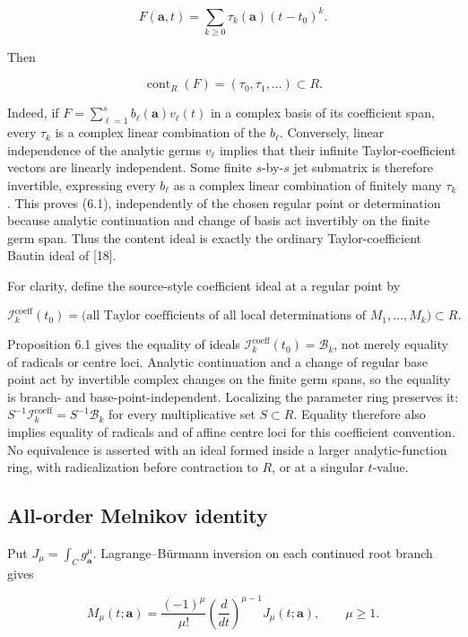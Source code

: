 \documentclass[
  11pt,
  a4paper,
]{amsart}
\begin{document}
\[
F(\boldsymbol a,t)=\sum_{k\ge0}\tau_k(\boldsymbol a)(t-t_0)^k.
\]

Then

\[
\operatorname{cont}_R(F)=(\tau_0,\tau_1,\ldots)\subset R.       \tag{6.1}
\]

Indeed, if \(F=\sum_{\ell=1}^sb_\ell(\boldsymbol a)v_\ell(t)\) in a
complex basis of its coefficient span, every \(\tau_k\) is a complex
linear combination of the \(b_\ell\). Conversely, linear independence of
the analytic germs \(v_\ell\) implies that their infinite
Taylor-coefficient vectors are linearly independent. Some finite
\(s\)-by-\(s\) jet submatrix is therefore invertible, expressing every
\(b_\ell\) as a complex linear combination of finitely many \(\tau_k\).
This proves (6.1), independently of the chosen regular point or
determination because analytic continuation and change of basis act
invertibly on the finite germ span. Thus the content ideal is exactly
the ordinary Taylor-coefficient Bautin ideal of {[}18{]}.

For clarity, define the source-style coefficient ideal at a regular
point by

\[
\mathcal I_k^{\mathrm{coeff}}(t_0)
=\bigl(\text{all Taylor coefficients of all local determinations of }
M_1,\ldots,M_k\bigr)\subset R.
\]

Proposition 6.1 gives the equality of ideals
\(\mathcal I_k^{\mathrm{coeff}}(t_0)=\mathcal B_k\), not merely equality
of radicals or centre loci. Analytic continuation and a change of
regular base point act by invertible complex changes on the finite germ
spans, so the equality is branch- and base-point-independent. Localizing
the parameter ring preserves it:
\(S^{-1}\mathcal I_k^{\mathrm{coeff}}=S^{-1}\mathcal B_k\) for every
multiplicative set \(S\subset R\). Equality therefore also implies
equality of radicals and of affine centre loci for this coefficient
convention. No equivalence is asserted with an ideal formed inside a
larger analytic-function ring, with radicalization before contraction to
\(R\), or at a singular \(t\)-value.

\subsection{All-order Melnikov identity}

Put \(J_\mu=\int_Cg_{\boldsymbol a}^\mu\). Lagrange--Bürmann inversion
on each continued root branch gives

\[
M_\mu(t;\boldsymbol a)
=\frac{(-1)^\mu}{\mu!}
\left(\frac d{dt}\right)^{\mu-1}J_\mu(t;\boldsymbol a),
\qquad \mu\ge1.                                      \tag{6.2}
\]
\end{document}
